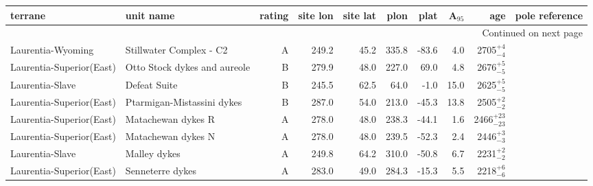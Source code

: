 \begin{longtable}{p{1 in}p{1 in}rrrrrrrp{1.5 in}}
\toprule
                       terrane &                                        unit name & rating &  site lon &  site lat &  plon &  plat &  A$_{95}$ &                    age &                                     pole reference \\ \hline
\midrule
\endhead
\midrule
\multicolumn{10}{r}{{Continued on next page}} \\ \hline
\midrule
\endfoot

\bottomrule
\endlastfoot
             Laurentia-Wyoming &                          Stillwater Complex - C2 &      A &     249.2 &      45.2 & 335.8 & -83.6 &       4.0 &     2705$^{+4}_{-4}$ &                                 \cite{Selkin2008a} \\ \hline
      Laurentia-Superior(East) &                     Otto Stock dykes and aureole &      B &     279.9 &      48.0 & 227.0 &  69.0 &       4.8 &     2676$^{+5}_{-5}$ &                               \cite{Pullaiah1975b} \\ \hline
               Laurentia-Slave &                                     Defeat Suite &      B &     245.5 &      62.5 &  64.0 &  -1.0 &      15.0 &     2625$^{+5}_{-5}$ &                               \cite{Mitchell2014a} \\ \hline
      Laurentia-Superior(East) &                       Ptarmigan-Mistassini dykes &      B &     287.0 &      54.0 & 213.0 & -45.3 &      13.8 &     2505$^{+2}_{-2}$ &                                  \cite{Evans2010a} \\ \hline
      Laurentia-Superior(East) &                               Matachewan dykes R &      A &     278.0 &      48.0 & 238.3 & -44.1 &       1.6 &   2466$^{+23}_{-23}$ &                                  \cite{Evans2010a} \\ \hline
      Laurentia-Superior(East) &                               Matachewan dykes N &      A &     278.0 &      48.0 & 239.5 & -52.3 &       2.4 &     2446$^{+3}_{-3}$ &                                  \cite{Evans2010a} \\ \hline
               Laurentia-Slave &                                     Malley dykes &      A &     249.8 &      64.2 & 310.0 & -50.8 &       6.7 &     2231$^{+2}_{-2}$ &                                 \cite{Buchan2012a} \\ \hline
      Laurentia-Superior(East) &                                 Senneterre dykes &      A &     283.0 &      49.0 & 284.3 & -15.3 &       5.5 &     2218$^{+6}_{-6}$ &                                 \cite{Buchan1993a} \\ \hline

\end{longtable}

